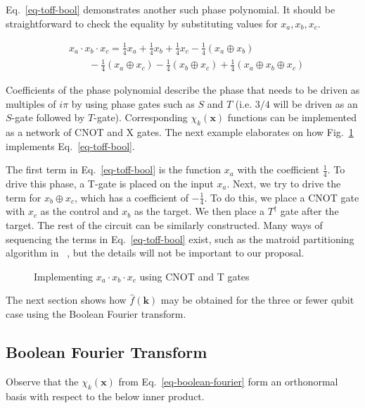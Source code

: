 Eq.~\ref{eq-toff-bool} demonstrates another such phase polynomial. It should be straightforward
to check the equality by substituting values for $x_a, x_b, x_c$.

\begin{equation}
  \label{eq-toff-bool}
  \begin{aligned}
    &x_a \cdot x_b \cdot x_c = \frac{1}{4}x_a + \frac{1}{4}x_b + \frac{1}{4}x_c - \frac{1}{4}(x_a \oplus x_b) \\
    &\qquad -\frac{1}{4}(x_a \oplus x_c) - \frac{1}{4}(x_b \oplus x_c) + \frac{1}{4}(x_a \oplus x_b \oplus x_c)
  \end{aligned}
\end{equation}

Coefficients of the phase polynomial describe the phase that needs to be driven as multiples of $i\pi$
by using phase gates such as $S$ and $T$ (i.e. $3/4$ will be driven as an $S$-gate followed by $T$-gate).
Corresponding $\chi_k(\mathbf{x})$ functions can be implemented as a network of CNOT and X gates. The
next example elaborates on how Fig.~\ref{fig-toff-mark-matroid} implements Eq.~\ref{eq-toff-bool}.

\begin{example}
  The first term in Eq.~\ref{eq-toff-bool} is the function $x_a$ with the coefficient $\frac{1}{4}$. To
  drive this phase, a T-gate is placed on the input $x_a$. Next, we try to drive the term for $x_b \oplus x_c$,
  which has a coefficient of $-\frac{1}{4}$. To do this, we place a CNOT gate with $x_c$ as the control and
  $x_b$ as the target. We then place a $T^{\dagger}$ gate after the target. The rest of the circuit can be
  similarly constructed. Many ways of sequencing the terms in Eq.~\ref{eq-toff-bool} exist, such as the
  matroid partitioning algorithm in ~\cite{bib-amy-matroid}, but the details will not be important to our proposal.
\end{example}

\begin{figure}[t]
  \centering
  \scalebox{0.7} {
    
  }
  \caption{Implementing $x_a \cdot x_b \cdot x_c$ using CNOT and T gates}
  \label{fig-toff-mark-matroid}
  \vspace{-0.5cm}
\end{figure}

The next section shows how $\hat{f}(\mathbf{k})$ may be obtained for the three or fewer qubit case using the
Boolean Fourier transform.

\subsection{Boolean Fourier Transform}
\label{Pre:Four}
Observe that the $\chi_k(\mathbf{x})$ from Eq.~\ref{eq-boolean-fourier} form an orthonormal basis with respect
to the below inner product.

